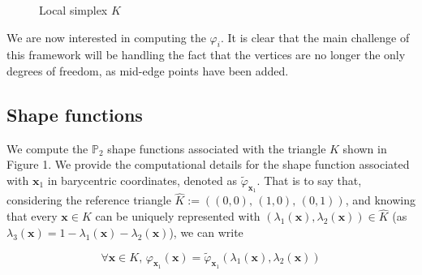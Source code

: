 \documentclass{article}
\theoremstyle{definition}
\theoremstyle{proposition}
\theoremstyle{theorem}
\theoremstyle{remark}
\theoremstyle{corollary}  %
\theoremstyle{exercise}
\theoremstyle{lemma}
\begin{document}
\begin{figure}[H]
\label{fig:tri}
\begin{center}
\caption{Local simplex $K$}
\end{center}
\end{figure}

We are now interested in computing the $\varphi_i$. It is clear that the main challenge of this framework will be handling the fact that the vertices are no longer the only degrees of freedom, as mid-edge points have been added.

\subsection{Shape functions}

We compute the $\mathbb{P}_2$ shape functions associated with the triangle $K$ shown in Figure 1. We provide the computational details for the shape function associated with $\bm x_1$ in barycentric coordinates, denoted as $\tilde{\varphi}_{\bm x_1}$. That is to say that, considering the reference triangle $\hat{K} := ((0, 0), \, (1, 0), \, (0, 1))$, and knowing that every $\bm x\in K$ can be uniquely represented with $(\lambda_1(\bm x), \lambda_2(\bm x)) \in \hat{K}$ (as $\lambda_3(\bm x) = 1 - \lambda_1(\bm x) - \lambda_2(\bm x)$), we can write 

$$\forall \bm x \in K, \, \varphi_{\bm x_1}(\bm x) = \tilde{\varphi}_{\bm x_1}(\lambda_1(\bm x), \lambda_2(\bm x))$$
\end{document}
